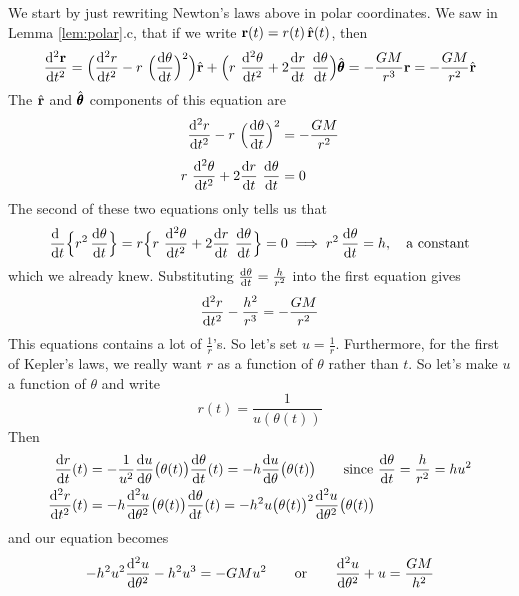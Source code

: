 We start by just rewriting Newton's laws above in polar coordinates.
We saw in Lemma \ref{lem:polar}.c, that if we write $\mathbf{r}(t) = r(t)\,\hat{\mathbf{r}}(t)$,
then 
\begin{align*}
\difftwo{\vr}{t} = 
  \Big(\difftwo{r}{t}-r\ \Big(\diff{\theta}{t}\Big)^2\Big) \hat\vr
   +\Big(r\ \difftwo{\theta}{t} + 2 \diff{r}{t}\ \diff{\theta}{t}\Big)\hat\vth
= -\frac{GM}{r^3}\vr
= -\frac{GM}{r^2}\hat\vr
\end{align*}
The $\hat{\mathbf{r}}$ and $\hat{{\pmb{\theta}}}$ components of this equation are
\begin{align*}
\difftwo{r}{t}-r\ \Big(\diff{\theta}{t}\Big)^2 &= -\frac{GM}{r^2} \\[0.05in]
r\ \difftwo{\theta}{t} + 2 \diff{r}{t}\ \diff{\theta}{t} &= 0
\end{align*}
The second of these two equations only tells us that
\begin{equation*}
\diff{\ }{t}\Big\{r^2\,\diff{\theta}{t}\Big\} 
= r\Big\{
     r\ \difftwo{\theta}{t} + 2 \diff{r}{t}\ \diff{\theta}{t}\Big\} = 0
\implies 
r^2\,\diff{\theta}{t} = h,\quad\text{a constant}
\end{equation*}
which we already knew. Substituting $\diff{\theta}{t} =\frac{h}{r^2}$
into the first equation gives
\begin{equation}\label{eqn:planetRadialR}
\difftwo{r}{t}-\frac{h^2}{r^3} = -\frac{GM}{r^2} 
\end{equation}
This equations contains a lot of $\frac{1}{r}$'s. So let's set $u=\frac{1}{r}$.
Furthermore, for the first of Kepler's laws, we really want $r$ as a function of
$\theta$ rather than $t$. So let's make $u$ a function of $\theta$ and write
\begin{equation*}
r(t) = \frac{1}{u(\theta(t))}
\end{equation*}
Then
\begin{align*}
\diff{r}{t}(t) &= -\frac{1}{u^2}
        \diff{u}{\theta}\big(\theta(t)\big)\diff{\theta}{t}(t)
   = - h\diff{u}{\theta}\big(\theta(t)\big)\qquad
\text{since $\diff{\theta}{t} = \frac{h}{r^2}=hu^2$} \\
\difftwo{r}{t}(t) 
   &= -h\difftwo{u}{\theta}\big(\theta(t)\big)\diff{\theta}{t}(t)
     = -h^2 u\big(\theta(t)\big)^2 \difftwo{u}{\theta}\big(\theta(t)\big)
\end{align*}
and our equation becomes
\begin{equation}\label{eqn:planetRadialU}
-h^2u^2\difftwo{u}{\theta} -h^2u^3= -GM u^2\qquad\text{or}\qquad
\difftwo{u}{\theta} + u = \frac{GM}{h^2}
\end{equation}
